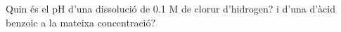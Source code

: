\begin{exr}{}
Quin és el pH d'una dissolució de 0.1 M de clorur d'hidrogen? i d'una d'àcid benzoic a la mateixa concentració?
\end{exr}
